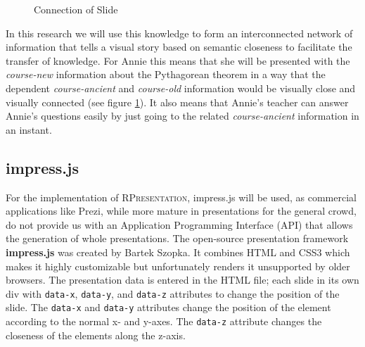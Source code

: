 \documentclass[twoside, 12pt]{article}
\newcommand{\sys}{\textsc{RPresentation}\xspace}
\begin{document}
\begin{figure}
\vspace{-28pt}
  \begin{center}
  \end{center}
\vspace{-20pt}
  \caption{Connection of Slide}
  \label{fig:arrowspyg}
\vspace{-10pt}
\end{figure}

In this research we will use this knowledge to form an interconnected network of information that tells a visual story based on semantic closeness to facilitate the transfer of knowledge. For Annie this means that she will be presented with the \textit{course-new} information about the Pythagorean theorem in a way that the dependent \textit{course-ancient} and \textit{course-old} information would be visually close and visually connected (see figure \ref{fig:arrowspyg}). It also means that Annie's teacher can answer Annie's questions easily by just going to the related \textit{course-ancient} information in an instant.

\subsection{impress.js}
\label{sec:Impressjs}

For the implementation of \sys, impress.js will be used, as commercial applications like Prezi, while more mature in presentations for the general crowd, do not provide us with an Application Programming Interface (API) that allows the generation of whole presentations. The open-source presentation framework \textbf{impress.js} \cite{JSImpress:npentrel14} was created by Bartek Szopka. It combines HTML and CSS3 which makes it highly customizable but unfortunately renders it unsupported by older browsers. The presentation data is entered in the HTML file; each slide in its own div with \texttt{data-x}, \texttt{data-y}, and \texttt{data-z} attributes to change the position of the slide. The \texttt{data-x} and \texttt{data-y} attributes change the position of the element according to the normal x- and y-axes. The \texttt{data-z} attribute changes the closeness of the elements along the z-axis.\\
\end{document}
